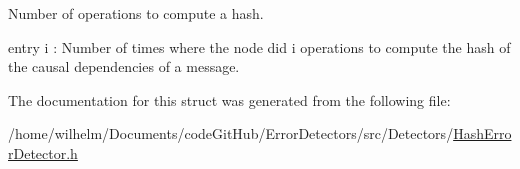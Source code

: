 Number of operations to compute a hash. 

entry i \+: Number of times where the node did i operations to compute the hash of the causal dependencies of a message. 

The documentation for this struct was generated from the following file\+:\begin{DoxyCompactItemize}
\item 
/home/wilhelm/\+Documents/code\+Git\+Hub/\+Error\+Detectors/src/\+Detectors/\hyperlink{_hash_error_detector_8h}{Hash\+Error\+Detector.\+h}\end{DoxyCompactItemize}
